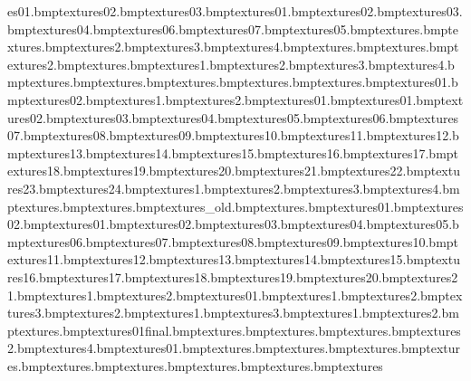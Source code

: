 es\torpedo01.bmp textures\torpedo02.bmp textures\torpedo03.bmp textures\trash01.bmp textures\trash02.bmp textures\trash03.bmp textures\trash04.bmp textures\trash06.bmp textures\trash07.bmp textures\trashcan05.bmp textures\treeend.bmp textures\treeleave.bmp textures\treeleave2.bmp textures\treeleave3.bmp textures\treeleave4.bmp textures\treeplanks.bmp textures\treeropes.bmp textures\treeropes2.bmp textures\treeropesend.bmp textures\treewall1.bmp textures\treewall2.bmp textures\treewall3.bmp textures\treewall4.bmp textures\tsamankles.bmp textures\tsambutton.bmp textures\tsamcollar.bmp textures\tsamteeth.bmp textures\tsamtie.bmp textures\vines01.bmp textures\vines02.bmp textures\wardensign1.bmp textures\wardensign2.bmp textures\water01.bmp textures\waterfall01.bmp textures\waterfall02.bmp textures\waterfall03.bmp textures\waterfall04.bmp textures\waterfall05.bmp textures\waterfall06.bmp textures\waterfall07.bmp textures\waterfall08.bmp textures\waterfall09.bmp textures\waterfall10.bmp textures\waterfall11.bmp textures\waterfall12.bmp textures\waterfall13.bmp textures\waterfall14.bmp textures\waterfall15.bmp textures\waterfall16.bmp textures\waterfall17.bmp textures\waterfall18.bmp textures\waterfall19.bmp textures\waterfall20.bmp textures\waterfall21.bmp textures\waterfall22.bmp textures\waterfall23.bmp textures\waterfall24.bmp textures\wbridge1.bmp textures\wbridge2.bmp textures\wbridge3.bmp textures\wbridge4.bmp textures\web.bmp textures\window.bmp textures\window_old.bmp textures\wires.bmp textures\woodblock01.bmp textures\woodblock02.bmp textures\wpaper01.bmp textures\wpaper02.bmp textures\wpaper03.bmp textures\wpaper04.bmp textures\wpaper05.bmp textures\wpaper06.bmp textures\wpaper07.bmp textures\wpaper08.bmp textures\wpaper09.bmp textures\wpaper10.bmp textures\wpaper11.bmp textures\wpaper12.bmp textures\wpaper13.bmp textures\wpaper14.bmp textures\wpaper15.bmp textures\wpaper16.bmp textures\wpaper17.bmp textures\wpaper18.bmp textures\wpaper19.bmp textures\wpaper20.bmp textures\wpaper21.bmp textures\wpaperfish1.bmp textures\wpaperfish2.bmp textures\zoorails01.bmp textures\zoosign1.bmp textures\zoosign2.bmp textures\zoosign3.bmp textures\hubpaththin2.bmp textures\hubpaththin1.bmp textures\hubpaththin3.bmp textures\building1.bmp textures\building2.bmp textures\vanpanel.bmp textures\zoobosstree01final.bmp textures\gbush.bmp textures\zoohubpiller.bmp textures\zoohubwall.bmp textures\zoohubwall2.bmp textures\zoohubwall4.bmp textures\snowvan01.bmp textures\vanside.bmp textures\vanbackdoor.bmp textures\vanroof.bmp textures\vanwindow.bmp textures\vanguard.bmp textures\vanguardrear.bmp textures\vanbonet.bmp textures\vantire.bmp textures\van 